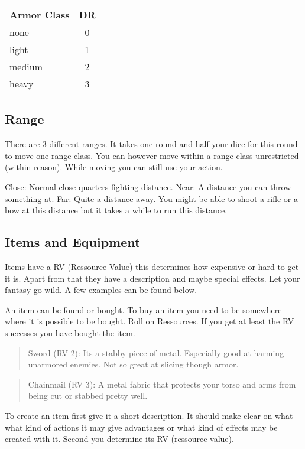 \documentclass[11pt]{article}
\begin{document}
{\begin{multicols}{2}[]
\begin{center}
\begin{tabular}{l|c}
\textbf{Armor Class} & \textbf{DR}\\
\hline
none & 0\\
light & 1\\
medium & 2\\
heavy & 3\\
\end{tabular}
\end{center}

\subsection{Range}
\label{sec:org7841fba}
There are 3 different ranges. It takes one round and half your dice for this round to move one range class. You can however move within a range class unrestricted (within reason). While moving you can still use your action.

Close: Normal close quarters fighting distance.
Near: A distance you can throw something at.
Far: Quite a distance away. You might be able to shoot a rifle or a bow at this distance but it takes a while to run this distance.

\subsection{Items and Equipment}
\label{sec:org62c178f}

Items have a RV (Ressource Value) this determines how expensive or hard to get it is. Apart from that they have a description and maybe special effects. Let your fantasy go wild. A few examples can be found below.

An item can be found or bought. To buy an item you need to be somewhere where it is possible to be bought. Roll on Ressources. If you get at least the RV successes you have bought the item.

\begin{quote}
Sword (RV 2):
Its a stabby piece of metal. Especially good at harming unarmored enemies. Not so great at slicing though armor. 
\end{quote}

\begin{quote}
Chainmail (RV 3):
A metal fabric that protects your torso and arms from being cut or stabbed pretty well. 
\end{quote}

To create an item first give it a short description. It should make clear on what what kind of actions it may give advantages or what kind of effects may be created with it. Second you determine its RV (ressource value).


\end{multicols}}
\end{document}
